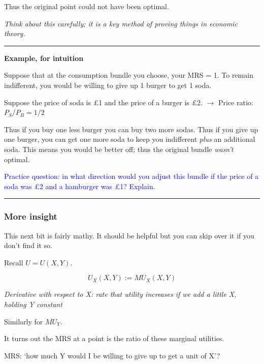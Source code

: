 \documentclass[]{article}
\begin{document}
Thus the original point could not have been optimal.

\emph{Think about this carefully; it is a key method of proving things in economic theory.}

\begin{center}\rule{0.5\linewidth}{\linethickness}\end{center}

\textbf{Example, for intuition}

Suppose that at the consumption bundle you choose, your MRS = 1. To remain indifferent, you would be willing to give up 1 burger to get 1 soda.

Suppose the price of soda is £1 and the price of a burger is £2. \(\rightarrow\) Price ratio: \(P_S/P_B = 1/2\)

Thus if you buy one less burger you can buy two more sodas.
Thus if you give up one burger, you can get one more soda to keep you indifferent \emph{plus} an additional soda.
This means you would be better off; thus the original bundle \emph{wasn't} optimal.

\textcolor{blue}{Practice question: in what direction would you adjust this bundle if the price of a soda was £2 and a hamburger was £1? Explain.}

\begin{center}\rule{0.5\linewidth}{\linethickness}\end{center}

\hypertarget{more-insight}{%
\subsubsection{More insight}\label{more-insight}}

This next bit is fairly mathy. It should be helpful but you can skip over it if you don't find it so.

Recall \(U=U(X,Y)\).

\[U_X(X,Y) := MU_X(X,Y)\]

\medskip

\emph{Derivative with respect to X: rate that utility increases if we add a little X, holding Y constant}

Similarly for \(MU_Y\).

\bigskip

It turns out the MRS at a point is the ratio of these marginal utilities.

MRS: `how much Y would I be willing to give up to get a unit of X'?

\bigskip
\end{document}
